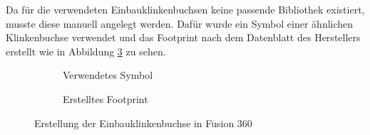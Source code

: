 Da für die verwendeten Einbauklinkenbuchsen keine passende Bibliothek existiert, musste diese manuell angelegt werden.
Dafür wurde ein Symbol einer ähnlichen Klinkenbuchse verwendet und das Footprint nach dem Datenblatt des Herstellers erstellt wie in Abbildung \ref{fig:Einbauklinkenbuchse in Fusion 360} zu sehen. \cite{cliff}

\begin{figure}[h]

\end{figure}

\begin{figure}[h]
	\centering
	\begin{subfigure}{.5\textwidth}
	\centering
	\setlength{\fboxsep}{1pt} %
	\setlength{\fboxrule}{1pt} %
	\caption{Verwendetes Symbol}
	\label{fig:Klinkenbuchse Symbol}
	\end{subfigure}%
	\begin{subfigure}{.5\textwidth}
	\centering
	\setlength{\fboxsep}{1pt} %
	\setlength{\fboxrule}{1pt} %
	\caption{Erstelltes Footprint}
	\label{fig:Klinkenbuchse Footprint}
	\end{subfigure}
	\caption{Erstellung der Einbauklinkenbuchse in Fusion 360}
	\label{fig:Einbauklinkenbuchse in Fusion 360}
\end{figure}


